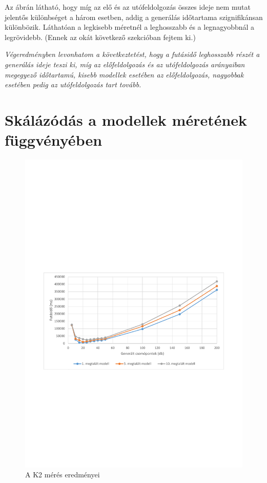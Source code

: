 Az ábrán látható, hogy míg az elő és az utófeldolgozás összes ideje nem mutat jelentős különbséget a három esetben, addig a generálás időtartama szignifikánsan különbözik. Láthatóan a legkisebb méretnél a leghosszabb és a legnagyobbnál a legrövidebb. (Ennek az okát következő szekcióban fejtem ki.)

\textit{Végeredményben levonhatom a következtetést, hogy a futásidő leghosszabb részét a generálás ideje teszi ki, míg az előfeldolgozás és az utófeldolgozás arányaiban megegyező időtartamú, kisebb modellek esetében az előfeldolgozás, nagyobbak esetében pedig az utófeldolgozás tart tovább.}   

\section{Skálázódás a modellek méretének függvényében}

\begin{figure}
	\centering
	\includegraphics[width=1\textwidth]{figures/statisticsPlottal1}
	\caption{A K2 mérés eredményei}
	\label{fig:BmeresEredmeny}
\end{figure}


